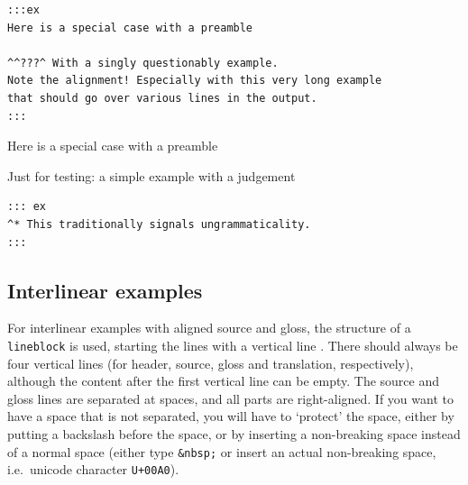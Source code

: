 \documentclass[
]{article}
\begin{document}
\begin{verbatim}
:::ex
Here is a special case with a preamble

^^???^ With a singly questionably example.
Note the alignment! Especially with this very long example
that should go over various lines in the output.
:::
\end{verbatim}

\begin{samepage}
\begin{exe} 
  \ex Here is a special case with a preamble
  \label{ex:4.7}
\end{exe}
\end{samepage}

Just for testing: a simple example with a judgement

\begin{verbatim}
::: ex
^* This traditionally signals ungrammaticality.
:::
\end{verbatim}

\begin{samepage}
\begin{exe} \judgewidth{*}
  \label{ex:4.8}
\end{exe}
\end{samepage}

\hypertarget{interlinear-examples}{%
\subsection{Interlinear examples}\label{interlinear-examples}}

For interlinear examples with aligned source and gloss, the structure of
a \texttt{lineblock} is used, starting the lines with a vertical line
\texttt{\textbar{}}. There should always be four vertical lines (for
header, source, gloss and translation, respectively), although the
content after the first vertical line can be empty. The source and gloss
lines are separated at spaces, and all parts are right-aligned. If you
want to have a space that is not separated, you will have to `protect'
the space, either by putting a backslash before the space, or by
inserting a non-breaking space instead of a normal space (either type
\texttt{\&nbsp;} or insert an actual non-breaking space, i.e.~unicode
character \texttt{U+00A0}).
\end{document}
